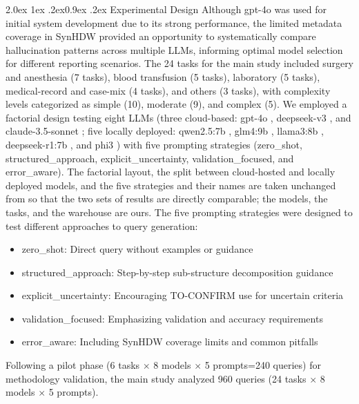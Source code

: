 \documentclass[10pt]{article}
\makeatletter
\renewcommand\subsection{\@startsection{subsection}{2}{\z@}%
  {2.0ex \@plus 1ex \@minus .2ex}{0.9ex \@plus .2ex}%
  {\normalfont\normalsize\bfseries}}
\makeatother
\begin{document}
\subsection{Experimental Design}\label{sec:expdesign}
Although gpt-4o was used for initial system development due to its strong
performance, the limited metadata coverage in SynHDW provided an opportunity to
systematically compare hallucination patterns across multiple LLMs, informing
optimal model selection for different reporting scenarios. The 24 tasks for the
main study included surgery and anesthesia (7 tasks), blood transfusion (5
tasks), laboratory (5 tasks), medical-record and case-mix (4 tasks), and others
(3 tasks), with complexity levels categorized as simple (10), moderate (9), and
complex (5). We employed a factorial design testing eight LLMs (three
cloud-based: gpt-4o \cite{gpt4}, deepseek-v3 \cite{dsv3}, and claude-3.5-sonnet
\cite{claude35}; five locally deployed: qwen2.5:7b \cite{qwen25}, glm4:9b
\cite{glm4}, llama3:8b \cite{llama3}, deepseek-r1:7b \cite{dsr1}, and phi3
\cite{phi3}) with five prompting
strategies (zero\_shot, structured\_approach, explicit\_uncertainty,
validation\_focused, and error\_aware). The factorial layout, the split between
cloud-hosted and locally deployed models, and the five strategies and their names
are taken unchanged from \cite{lee2025} so that the two sets of results are
directly comparable; the models, the tasks, and the warehouse are ours. The five
prompting strategies were designed to test different approaches to query
generation:

\begin{itemize}[leftmargin=1.4em,itemsep=1pt,topsep=2pt]
  \item zero\_shot: Direct query without examples or guidance
  \item structured\_approach: Step-by-step sub-structure decomposition guidance
  \item explicit\_uncertainty: Encouraging TO-CONFIRM use for uncertain criteria
  \item validation\_focused: Emphasizing validation and accuracy requirements
  \item error\_aware: Including SynHDW coverage limits and common pitfalls
\end{itemize}

\noindent Following a pilot phase (6 tasks $\times$ 8 models $\times$ 5
prompts=240 queries) for methodology validation, the main study analyzed 960
queries (24 tasks $\times$ 8 models $\times$ 5 prompts).
\end{document}
